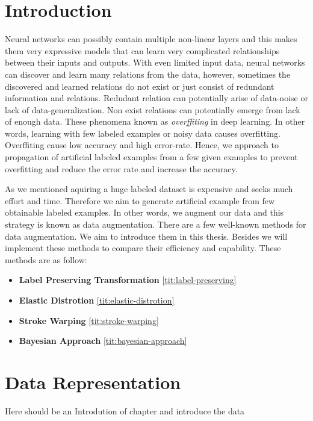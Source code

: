 \chapter{Introduction}

Neural networks can possibly contain multiple non-linear layers and this makes them very expressive models
that can learn very complicated relationships between their inputs and outputs. With even limited
input data, neural networks can discover and learn many relations from the data, however, sometimes the
discovered and learned relations do not exist or just consist of redundant information and
relations. Redudant relation can potentially arise of data-noise or lack of data-generalization. Non
exist relations can potentially emerge from lack of enough data. These phenomena known as
\textit{overffiting} in deep learning. In other words, learning with few labeled examples or noisy
data causes overfitting. Overffiting cause low accuracy and high error-rate. Hence, we approach to propagation of artificial
labeled examples from a few given examples to prevent overfitting and reduce the error rate and increase
the accuracy.

As we mentioned aquiring a huge labeled dataset is expensive and seeks much effort and time. Therefore we aim to generate artificial example from few obtainable labeled examples. In other words, we
augment our data and this strategy is known as data augmentation. There are a few well-known methods for data augmentation. We aim to introduce them in this thesis.  Besides we will implement these
methods to compare their efficiency and capability. These methods are as follow:
\begin{itemize}
  \item \textbf{Label Preserving Transformation} \ref{tit:label-preserving}
  \item \textbf{Elastic Distrotion} \ref{tit:elastic-distrotion}
  \item \textbf{Stroke Warping} \ref{tit:stroke-warping}
  \item \textbf{Bayesian Approach} \ref{tit:bayesian-approach}
\end{itemize}



\chapter{Data Representation}
Here should be an Introdution of chapter and introduce the data

